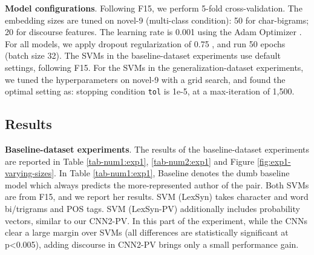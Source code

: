 \begin{table}[t]
\begin{center}
\caption{Macro-averaged F1 score for multi-class author classification on the novel-9 dataset, using either no discourse (None), grammatical relations (GR), or RST relations (RST). These experiments additionally include the Discourse Embedding (DE) models for GR and RST.}
\label{tab-num2:exp1}
\end{center}
\end{table}

\noindent
\textbf{Model configurations}.
Following F15, we perform 5-fold cross-validation.
The embedding sizes are tuned on novel-9 (multi-class condition): 50 for char-bigrams; 20 for discourse features. 
The learning rate is 0.001 using the Adam Optimizer \citep{Kingma:2014}.
For all models, we apply dropout regularization of 0.75 \citep{Srivastava:2014}, and run 50 epochs (batch size 32).
The SVMs in the baseline-dataset experiments use default settings, following F15.
For the SVMs in the generalization-dataset experiments, we tuned the hyperparameters on novel-9 with a grid search, and found the optimal setting as: stopping condition \texttt{tol} is 1e-5, at a max-iteration of 1,500. 

\subsection{Results}
\label{subsec:results}
\textbf{Baseline-dataset experiments}.
The results of the baseline-dataset experiments are reported in Table \ref{tab-num1:exp1}, \ref{tab-num2:exp1} and Figure \ref{fig:exp1-varying-sizes}. 
In Table \ref{tab-num1:exp1}, Baseline denotes the dumb baseline model which always predicts the more-represented author of the pair. 
Both SVMs are from F15, and we report her results.
SVM (LexSyn) takes character and word bi/trigrams and POS tags. 
SVM (LexSyn-PV) additionally includes probability vectors, similar to our CNN2-PV.
In this part of the experiment, while the CNNs clear a large margin over SVMs (all differences are statistically significant at p<0.005), adding discourse in CNN2-PV brings only a small performance gain.


